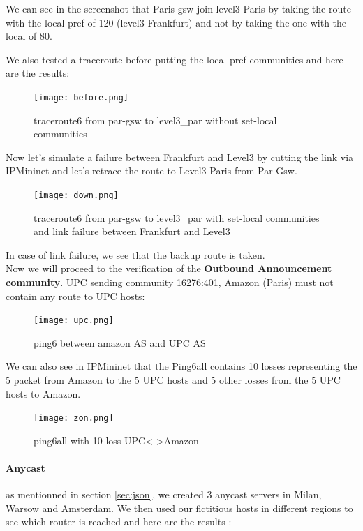 \documentclass[letter, 9pt, conference]{ieeeconf}
\begin{document}
We can see in the screenshot that Paris-gsw join level3 Paris by taking the route with the local-pref of 120 (level3 Frankfurt) and not by taking the one with the local of 80.

We also tested a traceroute before putting the local-pref communities and here are the results:

\begin{figure}[H]
    \centering
    \texttt{[image: before.png]}
    \caption{traceroute6 from par-gsw to level3\_par without set-local communities}
    \label{fig:my_label}
\end{figure}

Now let's simulate a failure between Frankfurt and Level3 by cutting the link via IPMininet and let's retrace the route to Level3 Paris from Par-Gsw.

\begin{figure}[H]
    \centering
    \texttt{[image: down.png]}
    \caption{traceroute6 from par-gsw to level3\_par with set-local communities and link failure between Frankfurt and Level3}
    \label{fig:my_label}
\end{figure}

In case of link failure, we see that the backup route is taken.\\

Now we will proceed to the verification of the \textbf{Outbound Announcement community}. UPC sending community 16276:401, Amazon (Paris) must not contain any route to UPC hosts:

\begin{figure}[H]
    \centering
    \texttt{[image: upc.png]}
    \caption{ping6 between amazon AS and UPC AS}
    \label{fig:my_label}
\end{figure}

We can also see in IPMininet that the Ping6all contains 10 losses representing the 5 packet from Amazon to the 5 UPC hosts and 5 other losses from the 5 UPC hosts to Amazon.

\begin{figure}[H]
    \centering
    \texttt{[image: zon.png]}
    \caption{ping6all with 10 loss UPC<->Amazon}
    \label{fig:my_label}
\end{figure}


\paragraph{Anycast} as mentionned in section \ref{sec:json}, we created 3 anycast servers in Milan, Warsow and Amsterdam. We then used our fictitious hosts in different regions to see which router is reached and here are the results : 
\end{document}

